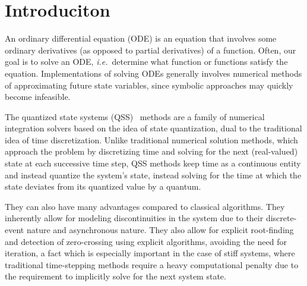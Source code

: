 \documentclass[10pt]{article}
\begin{document}
\newcommand{\bottomline}{\arrayrulecolor{white}\specialrule{\aboverulesep}{0pt}{0pt}%
	\arrayrulecolor{black}\specialrule{\heavyrulewidth}{0pt}{\belowbottomsep}}%

\newcommand{\bottomlinec}{\arrayrulecolor{tablerowcolor}\specialrule{\aboverulesep}{0pt}{0pt}%
	\arrayrulecolor{black}\specialrule{\heavyrulewidth}{0pt}{\belowbottomsep}}%

\newcommand{\bottomlinect}{\arrayrulecolor{tableheadcolor}\specialrule{\aboverulesep}{0pt}{0pt}%
	\arrayrulecolor{black}\specialrule{\heavyrulewidth}{0pt}{\belowbottomsep}}%



\maketitle



\pagestyle{myheadings}


\section{Introduciton}

An ordinary differential equation (ODE) is an equation that involves some ordinary derivatives (as opposed to partial derivatives) of a function. Often, our goal is to solve an ODE, {\em i.e.}\ determine what function or functions satisfy the equation. Implementations of solving ODEs generally involves numerical methods of approximating future state variables, since symbolic approaches may quickly become infeasible.

The quantized state systems (QSS)~\cite{MigoniKofman2009} methods are a family of numerical integration solvers based on the idea of state quantization, dual to the traditional idea of time discretization. Unlike traditional numerical solution methods, which approach the problem by discretizing time and solving for the next (real-valued) state at each successive time step, QSS methods keep time as a continuous entity and instead quantize the system's state, instead solving for the time at which the state deviates from its quantized value by a quantum.

They can also have many advantages compared to classical algorithms. They inherently allow for modeling discontinuities in the system due to their discrete-event nature and asynchronous nature. They also allow for explicit root-finding and detection of zero-crossing using explicit algorithms, avoiding the need for iteration, a fact which is especially important in the case of stiff systems, where traditional time-stepping methods require a heavy computational penalty due to the requirement to implicitly solve for the next system state.
\end{document}

